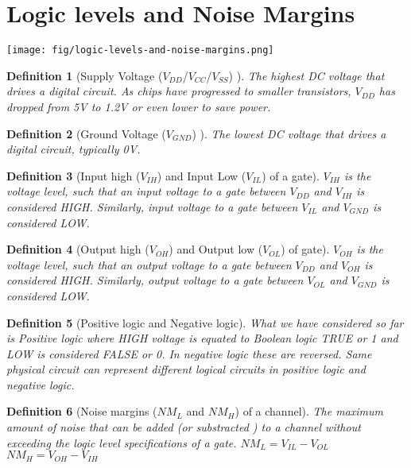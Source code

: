 \documentclass{article}
\newtheorem{definition}{Definition}
\newcommand{\notescol}{white}
\begin{document}
\section{Logic levels and Noise Margins}

\texttt{[image: fig/logic-levels-and-noise-margins.png]}

\begin{definition}[Supply Voltage ($V_{DD}$/$V_{CC}$/$V_{SS}$) ]
  \color{\notescol}
  The highest DC voltage that drives a digital circuit. As chips have progressed
  to smaller transistors, $V_{DD}$ has dropped from 5V to 1.2V or even lower to
  save power.
\end{definition}

\begin{definition}[Ground Voltage ($V_{GND}$) ]
  \color{\notescol}
  The lowest DC voltage that drives a digital circuit, typically 0V.
\end{definition}

\begin{definition}[Input high ($V_{IH}$) and Input Low ($V_{IL}$) of a gate]
  \color{\notescol}
  $V_{IH}$ is the voltage level, such that an input voltage to a gate between $V_{DD}$
  and $V_{IH}$ is considered \emph{HIGH}. Similarly, input voltage to a gate
  between $V_{IL}$ and $V_{GND}$ is considered \emph{LOW}.
\end{definition}

\begin{definition}[Output high ($V_{OH}$) and Output low ($V_{OL}$) of gate]
  \color{\notescol}
  $V_{OH}$ is the voltage level, such that an output voltage to a gate between $V_{DD}$
  and $V_{OH}$ is considered \emph{HIGH}. Similarly, output voltage to a gate
  between $V_{OL}$ and $V_{GND}$ is considered \emph{LOW}.
\end{definition}

\begin{definition}[Positive logic and Negative logic]
  \color{\notescol}
  What we have considered so far is Positive logic where \emph{HIGH} voltage is
  equated to Boolean logic \emph{TRUE} or \emph{1} and \emph{LOW} is considered
  \emph{FALSE} or \emph{0}. In negative logic these are reversed. Same physical
  circuit can represent different logical circuits in positive logic and
  negative logic.
\end{definition}

\begin{definition}[Noise margins ($NM_L$ and $NM_H$) of a channel]
  \color{\notescol}
  The maximum amount of noise that can be added (or substracted ) to a channel
  without exceeding the logic level specifications of a gate.  
  $NM_L  = V_{IL} - V_{OL}$ \\
  $NM_H  = V_{OH} - V_{IH}$
\end{definition}
\end{document}
